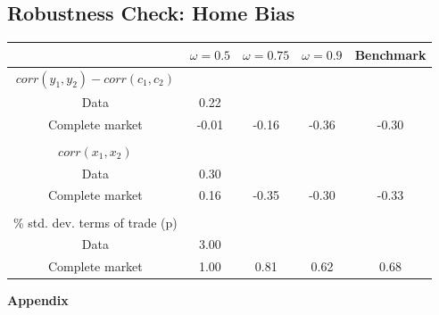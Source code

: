 \documentclass[11pt,a4paper]{article}
\begin{document}
\subsection{Robustness Check: Home Bias}
\begin{table}[H]
\begin{center}
\begin{tabular}{ccccc}
\hline
\hline  
                                & $\omega=0.5$ & $\omega=0.75$ & $\omega=0.9$ &Benchmark\\
                                \hline
$corr(y_1,y_2)-corr(c_1,c_2)$    &              &               &            &  \\
Data                             &   0.22           &               &           &   \\
Complete market                  &   -0.01          &     -0.16          &    -0.36&   -0.30      \\
                                 &              &               &              &\\
$corr(x_1,x_2)$                    &              &               &             & \\
Data                             &    0.30          &               &            &  \\
Complete market                  &    0.16          &    -0.35           &    -0.30&   -0.33       \\
                                 &              &               &              &\\
\% std. dev. terms of trade (p) &              &               &              &\\
Data                             &    3.00          &               &          &    \\
Complete market                  &    1.00          &     0.81          &     0.62&    0.68     \\
\hline
\hline
\end{tabular}
\end{center}
\end{table}








\centering
\textbf{Appendix}
\appendix
\end{document}
